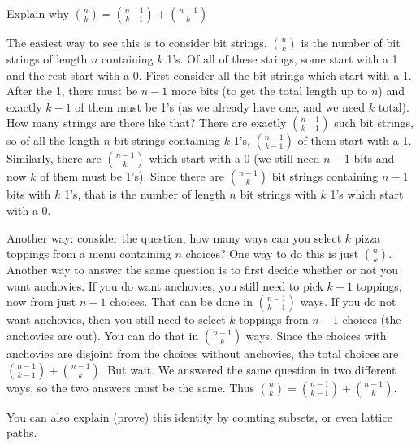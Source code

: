 \documentclass[12pt]{article}
\begin{document}
\begin{example}
  Explain why ${n \choose k} = {n-1 \choose k-1} + {n-1 \choose k}$
  \begin{solution}
    The easiest way to see this is to consider bit strings.  ${n \choose k}$ is the number of bit strings of length $n$ containing $k$ 1's.  Of all of these strings, some start with a 1 and the rest start with a 0.  First consider all the bit strings which start with a 1.  After the 1, there must be $n-1$ more bits (to get the total length up to $n$) and exactly $k-1$ of them must be 1's (as we already have one, and we need $k$ total).  How many strings are there like that?  There are exactly ${n-1 \choose k-1}$ such bit strings, so of all the length $n$ bit strings containing $k$ 1's, ${n-1 \choose k-1}$ of them start with a 1.  Similarly, there are ${n-1\choose k}$ which start with a 0 (we still need $n-1$ bits and now $k$ of them must be 1's).  Since there are ${n-1 \choose k}$ bit strings containing $n-1$ bits with $k$ 1's, that is the number of length $n$ bit strings with $k$ 1's which start with a 0.
    
    Another way: consider the question, how many ways can you select $k$ pizza toppings from a menu containing $n$ choices?  One way to do this is just ${n \choose k}$.  Another way to answer the same question is to first decide whether or not you want anchovies.  If you do want anchovies, you still need to pick $k-1$ toppings, now from just $n-1$ choices.  That can be done in ${n-1 \choose k-1}$ ways.  If you do not want anchovies, then you still need to select $k$ toppings from $n-1$ choices (the anchovies are out).  You can do that in ${n-1 \choose k}$ ways.  Since the choices with anchovies are disjoint from the choices without anchovies, the total choices are ${n-1 \choose k-1}+{n-1 \choose k}$.  But wait.  We answered the same question in two different ways, so the two answers must be the same.  Thus ${n \choose k} = {n-1\choose k-1} + {n-1 \choose k}$.
    
    You can also explain (prove) this identity by counting subsets, or even lattice paths.
  \end{solution}

\end{example}
\end{document}
